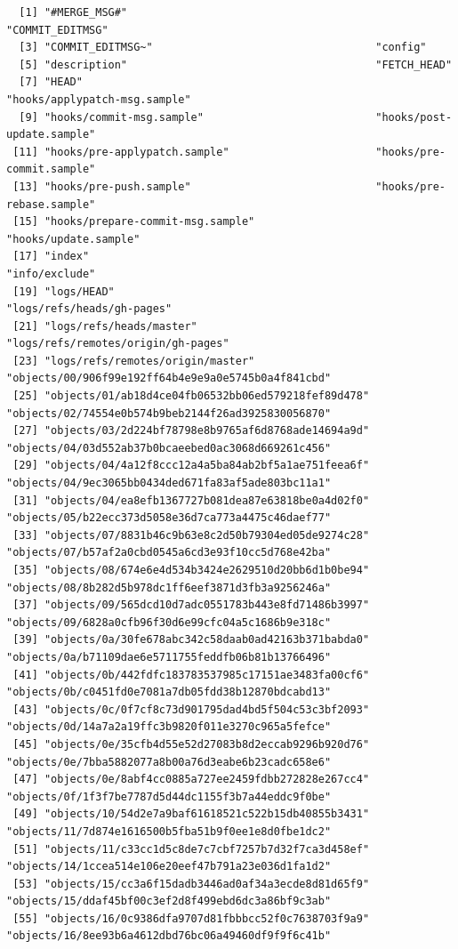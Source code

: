 \documentclass[]{book}
\theoremstyle{definition}
\theoremstyle{definition}
\theoremstyle{remark}
\begin{document}
\begin{verbatim}
  [1] "#MERGE_MSG#"                                       "COMMIT_EDITMSG"                                   
  [3] "COMMIT_EDITMSG~"                                   "config"                                           
  [5] "description"                                       "FETCH_HEAD"                                       
  [7] "HEAD"                                              "hooks/applypatch-msg.sample"                      
  [9] "hooks/commit-msg.sample"                           "hooks/post-update.sample"                         
 [11] "hooks/pre-applypatch.sample"                       "hooks/pre-commit.sample"                          
 [13] "hooks/pre-push.sample"                             "hooks/pre-rebase.sample"                          
 [15] "hooks/prepare-commit-msg.sample"                   "hooks/update.sample"                              
 [17] "index"                                             "info/exclude"                                     
 [19] "logs/HEAD"                                         "logs/refs/heads/gh-pages"                         
 [21] "logs/refs/heads/master"                            "logs/refs/remotes/origin/gh-pages"                
 [23] "logs/refs/remotes/origin/master"                   "objects/00/906f99e192ff64b4e9e9a0e5745b0a4f841cbd"
 [25] "objects/01/ab18d4ce04fb06532bb06ed579218fef89d478" "objects/02/74554e0b574b9beb2144f26ad3925830056870"
 [27] "objects/03/2d224bf78798e8b9765af6d8768ade14694a9d" "objects/04/03d552ab37b0bcaeebed0ac3068d669261c456"
 [29] "objects/04/4a12f8ccc12a4a5ba84ab2bf5a1ae751feea6f" "objects/04/9ec3065bb0434ded671fa83af5ade803bc11a1"
 [31] "objects/04/ea8efb1367727b081dea87e63818be0a4d02f0" "objects/05/b22ecc373d5058e36d7ca773a4475c46daef77"
 [33] "objects/07/8831b46c9b63e8c2d50b79304ed05de9274c28" "objects/07/b57af2a0cbd0545a6cd3e93f10cc5d768e42ba"
 [35] "objects/08/674e6e4d534b3424e2629510d20bb6d1b0be94" "objects/08/8b282d5b978dc1ff6eef3871d3fb3a9256246a"
 [37] "objects/09/565dcd10d7adc0551783b443e8fd71486b3997" "objects/09/6828a0cfb96f30d6e99cfc04a5c1686b9e318c"
 [39] "objects/0a/30fe678abc342c58daab0ad42163b371babda0" "objects/0a/b71109dae6e5711755feddfb06b81b13766496"
 [41] "objects/0b/442fdfc183783537985c17151ae3483fa00cf6" "objects/0b/c0451fd0e7081a7db05fdd38b12870bdcabd13"
 [43] "objects/0c/0f7cf8c73d901795dad4bd5f504c53c3bf2093" "objects/0d/14a7a2a19ffc3b9820f011e3270c965a5fefce"
 [45] "objects/0e/35cfb4d55e52d27083b8d2eccab9296b920d76" "objects/0e/7bba5882077a8b00a76d3eabe6b23cadc658e6"
 [47] "objects/0e/8abf4cc0885a727ee2459fdbb272828e267cc4" "objects/0f/1f3f7be7787d5d44dc1155f3b7a44eddc9f0be"
 [49] "objects/10/54d2e7a9baf61618521c522b15db40855b3431" "objects/11/7d874e1616500b5fba51b9f0ee1e8d0fbe1dc2"
 [51] "objects/11/c33cc1d5c8de7c7cbf7257b7d32f7ca3d458ef" "objects/14/1ccea514e106e20eef47b791a23e036d1fa1d2"
 [53] "objects/15/cc3a6f15dadb3446ad0af34a3ecde8d81d65f9" "objects/15/ddaf45bf00c3ef2d8f499ebd6dc3a86bf9c3ab"
 [55] "objects/16/0c9386dfa9707d81fbbbcc52f0c7638703f9a9" "objects/16/8ee93b6a4612dbd76bc06a49460df9f9f6c41b"
\end{verbatim}
\end{document}
